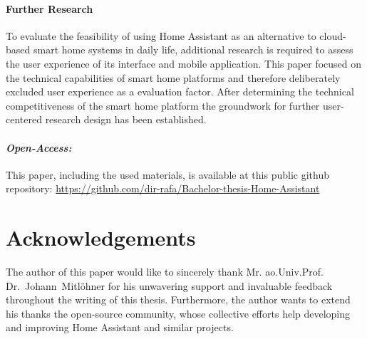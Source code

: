\paragraph{Further Research}
To evaluate the feasibility of using Home Assistant as an alternative to cloud-based smart home systems in daily life, additional research is required to assess the user experience of its interface and mobile application. This paper focused on the technical capabilities of smart home platforms and therefore deliberately excluded user experience as a evaluation factor. After determining the technical competitiveness of the smart home platform the groundwork for further user-centered research design has been established.

\paragraph{\textit{Open-Access:}}
This paper, including the used materials, is available at this public github repository: \href{https://github.com/dir-rafa/Bachelor-thesis-Home-Assistant}{https://github.com/dir-rafa/Bachelor-thesis-Home-Assistant}

\section*{Acknowledgements}

The author of this paper would like to sincerely thank Mr. ao.Univ.Prof. Dr.~Johann~Mitl\"ohner for his unwavering support and invaluable feedback throughout the writing of this thesis. Furthermore, the author wants to extend his thanks the open-source community, whose collective efforts help developing and improving Home Assistant and similar projects.